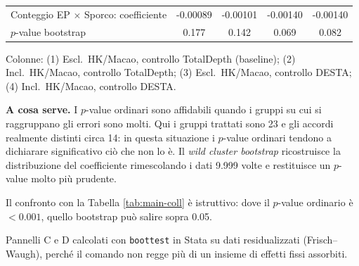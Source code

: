 \begin{table}[htbp]
\begin{threeparttable}
\begin{tabular}{lcccc}
\addlinespace
Conteggio EP $\times$ Sporco: coefficiente & -0.00089 & -0.00101 & -0.00140 & -0.00140 \\
\quad $p$-value bootstrap & 0.177 & 0.142 & 0.069 & 0.082 \\
\bottomrule
\end{tabular}
\begin{tablenotes}[flushleft]\footnotesize
\item Colonne: (1) Escl.\ HK/Macao, controllo TotalDepth (baseline); (2) Incl.\ HK/Macao, controllo TotalDepth; (3) Escl.\ HK/Macao, controllo DESTA; (4) Incl.\ HK/Macao, controllo DESTA.
\item \textbf{A cosa serve.} I $p$-value ordinari sono affidabili quando i gruppi su cui si raggruppano gli errori sono molti. Qui i gruppi trattati sono 23 e gli accordi realmente distinti circa 14: in questa situazione i $p$-value ordinari tendono a dichiarare significativo ci\`o che non lo \`e. Il \emph{wild cluster bootstrap} ricostruisce la distribuzione del coefficiente rimescolando i dati 9.999 volte e restituisce un $p$-value molto pi\`u prudente.
\item Il confronto con la Tabella \ref{tab:main-coll} \`e istruttivo: dove il $p$-value ordinario \`e $<0.001$, quello bootstrap pu\`o salire sopra 0.05.
\item Pannelli C e D calcolati con \texttt{boottest} in Stata su dati residualizzati (Frisch--Waugh), perch\'e il comando non regge pi\`u di un insieme di effetti fissi assorbiti.
\end{tablenotes}
\end{threeparttable}
\end{table}

